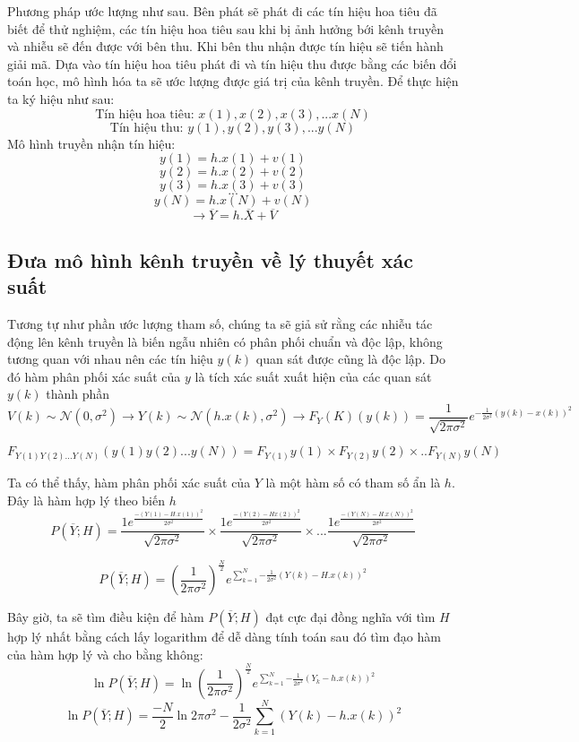 \documentclass{article}
\begin{document}
Phương pháp ước lượng như sau. Bên phát sẽ phát đi các tín hiệu hoa tiêu đã biết để thử nghiệm, các tín hiệu hoa tiêu sau khi bị ảnh hưởng bới kênh truyền và nhiễu sẽ đến được với bên thu. Khi bên thu nhận được tín hiệu sẽ tiến hành giải mã. Dựa vào tín hiệu hoa tiêu phát đi và tín hiệu thu được bằng các biến đổi toán học, mô hình hóa ta sẽ ước lượng được giá trị của kênh truyền. Để thực hiện ta ký hiệu như sau:
$$\text{Tín hiệu hoa tiêu: } x(1), x(2), x(3),...x(N)$$
$$\text{Tín hiệu thu: } y(1), y(2), y(3),...y(N)$$
Mô hình truyền nhận tín hiệu:
$$y(1) = h.x(1) + v(1) $$
$$y(2) = h.x(2) + v(2)$$
$$y(3) = h.x(3) + v(3)$$
$$...$$
$$y(N) = h.x(N) + v(N)$$
$$\rightarrow \overline{Y} = h.\overline{X} + \overline{V}$$
\subsection{Đưa mô hình kênh truyền về lý thuyết xác suất}
Tương tự như phần ước lượng tham số, chúng ta sẽ giả sử rằng các nhiễu tác động lên kênh truyền là biến ngẫu nhiên có phân phối chuẩn và độc lập, không tương quan với nhau nên các tín hiệu $y(k)$ quan sát được cũng là độc lập. Do đó hàm phân phối xác suất của $y$ là tích xác suất xuất hiện của các quan sát $y(k)$ thành phần
$$V(k) \sim \mathcal{N}(0,\sigma^2) \rightarrow Y(k) \sim \mathcal{N}(h.x(k),\sigma^2)  \rightarrow F_Y(K)(y(k)) = \frac{1}{\sqrt{2\pi\sigma^2}} e^{-\frac{1}{2\sigma^2} (y(k) - x(k))^2} $$

$$F_{Y(1)Y(2)...Y(N)}(y(1)y(2)...y(N)) = F_{Y(1)}y(1)\times F_{Y(2)}y(2)\times..F_{Y(N)}y(N)$$

Ta có thể thấy, hàm phân phối xác suất của $Y$ là một hàm số có tham số ẩn là $h$. Đây là hàm hợp lý theo biến $h$
$$P(\overline{Y}; H) = \frac{1 e^{\frac{-(Y(1)-H.x(1))^2}{2\sigma^2}}}{\sqrt{2\pi\sigma^2}} \times \frac{1 e^{\frac{-(Y(2)-Hx(2))^2}{2\sigma^2}}}{\sqrt{2\pi\sigma^2}} \times... \frac{1 e^{\frac{-(Y(N)-H.x(N))^2}{2\sigma^2}}}{\sqrt{2\pi\sigma^2}}$$

$$P(\overline{Y}; H)= {(\frac{1}{2 \pi \sigma^2})}^{\frac{N}{2}} e^{\sum_{k=1}^{N}{-\frac{1}{2 \sigma^2} (Y(k) - H.x(k))^2}} $$

Bây giờ, ta sẽ tìm điều kiện để hàm $ P(\overline{Y}; H)$ đạt cực đại đồng nghĩa với tìm $H$ hợp lý nhất bằng cách lấy logarithm để dễ dàng tính toán sau đó tìm đạo hàm của hàm hợp lý và cho bằng không:
$$\ln P(\overline{Y}; H) = \ln {(\frac{1}{2 \pi \sigma^2})}^{\frac{N}{2}} e^{\sum_{k=1}^{N}{-\frac{1}{2 \sigma^2} (Y_k - h.x(k))^2}} $$
$$\ln P(\overline{Y}; H) =\frac{-N}{2} \ln2\pi\sigma^2 - \frac{1}{2\sigma^2} \sum_{k=1}^{N}(Y(k)-h.x(k))^2$$
\end{document}

